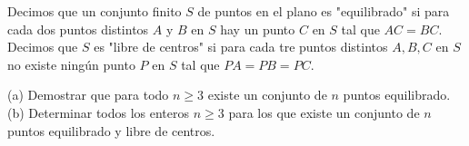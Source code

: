 Decimos que un conjunto finito $S$ de puntos en el plano es "equilibrado" si para cada dos puntos distintos $A$ y $B$ en $S$ hay un punto $C$ en $S$ tal que $AC=BC$. Decimos que $S$ es "libre de centros" si para cada tre puntos distintos $A,B,C$ en $S$ no existe ningún punto $P$ en $S$ tal que $PA=PB=PC$. \newline 

(a) Demostrar que para todo $n\ge 3$ existe un conjunto de $n$ puntos equilibrado. \newline 
(b) Determinar todos los enteros $n\ge 3$ para los que existe un conjunto de $n$ puntos equilibrado y libre de centros.